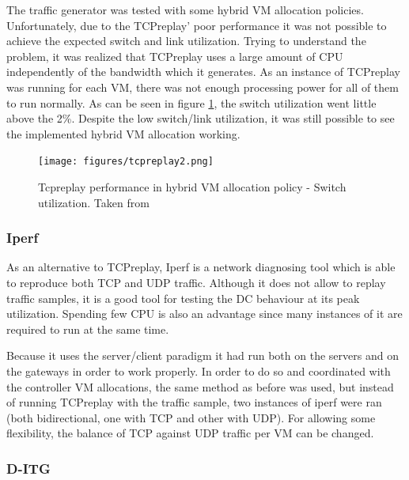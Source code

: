 \documentclass[12pt,english,oneside]{book}
\begin{document}
The traffic generator was tested with some hybrid VM allocation policies.
Unfortunately, due to the TCPreplay' poor performance it was not possible to achieve the expected switch and link utilization.
Trying to understand the problem, it was realized that TCPreplay uses a large amount of CPU independently of the bandwidth which it generates. As an instance of TCPreplay was running for each VM, there was not enough processing power for all of them to run normally.
As can be seen in figure \ref{fig:tcpreplay}, the switch utilization went little above the 2\%.
Despite the low switch/link utilization, it was still possible to see the implemented hybrid VM allocation working.

\begin{figure}[h!tbp]
        \centering
        \texttt{[image: figures/tcpreplay2.png]}
        \caption{Tcpreplay performance in hybrid VM allocation policy - Switch utilization. Taken from \cite{im2013}}
        \label{fig:tcpreplay}
\end{figure}

\subsubsection{Iperf}
\hspace{0.6cm}

As an alternative to TCPreplay, Iperf\cite{iperf} is a network diagnosing tool which is able to reproduce both TCP and UDP traffic.
Although it does not allow to replay traffic samples, it is a good tool for testing the DC behaviour at its peak utilization.
Spending few CPU is also an advantage since many instances of it are required to run at the same time.

Because it uses the server/client paradigm it had run both on the servers and on the gateways in order to work properly. In order to do so and coordinated with the controller VM allocations, the same method as before was used, but instead of running TCPreplay with the traffic sample, two instances of iperf were ran (both bidirectional, one with TCP and other with UDP). For allowing some flexibility, the balance of TCP against UDP traffic per VM can be changed.

\subsubsection{D-ITG}
\hspace{0.6cm}
\end{document}

